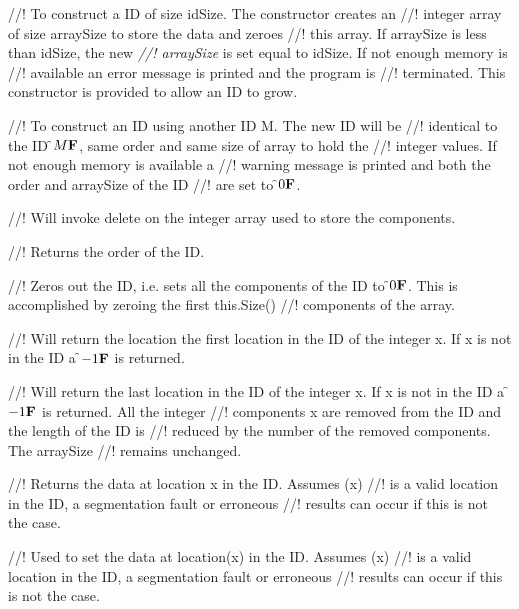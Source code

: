 //! To construct a ID of size \p idSize. The constructor creates an
//! integer array of size \p arraySize to store the data and zeroes
//! this array. If \p arraySize is less than \p idSize, the new {\em
//! arraySize} is set equal to \p idSize. If not enough memory is
//! available an error message is printed and the program is
//! terminated. This constructor is provided to allow an ID to grow.  

//! To construct an ID using another ID \p M. The new ID will be
//! identical to the ID \f$M{\bf F}$, same order and same size of array to hold the
//! integer values. If not enough memory is available a
//! warning message is printed and both the order and arraySize of the ID
//! are set to \f$0{\bf F}$.

//! Will invoke delete on the integer array used to store the components.

//! Returns the order of the ID.

//! Zeros out the ID, i.e. sets all the components of the ID to
\f$0{\bf F}$. This is accomplished by zeroing the first this.Size()
//! components of the array.

//! Will return the location the first location in the ID of the integer
\p x. If \p x is not in the ID a \f$-1{\bf F}$ is returned.

//! Will return the last location in the ID of the integer
\p x. If \p x is not in the ID a \f$-1{\bf F}$ is returned. All the integer
//! components \p x are removed from the ID and the length of the ID is
//! reduced by the number of the removed components. The \p arraySize
//! remains unchanged. 


//! Returns the data at location \p x in the ID. Assumes (\p x)
//! is a valid location in the ID, a segmentation fault or erroneous
//! results can occur if this is not the case.

//! Used to set the data at location(\p x) in the ID. Assumes (\p x)
//! is a valid location in the ID, a segmentation fault or erroneous
//! results can occur if this is not the case.

